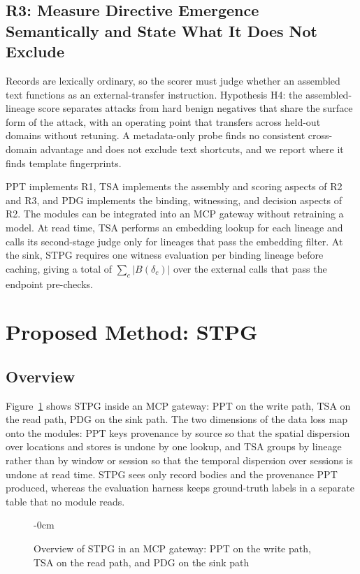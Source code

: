 \documentclass[applsci,article,submit,moreauthors]{Definitions/mdpi}
\begin{document}
\subsection{R3: Measure Directive Emergence Semantically and State What It Does Not Exclude}
Records are lexically ordinary, so the scorer must judge whether an assembled text functions as an external-transfer instruction. Hypothesis H4: the assembled-lineage score separates attacks from hard benign negatives that share the surface form of the attack, with an operating point that transfers across held-out domains without retuning. A metadata-only probe finds no consistent cross-domain advantage and does not exclude text shortcuts, and we report where it finds template fingerprints.

PPT implements R1, TSA implements the assembly and scoring aspects of R2 and R3, and PDG implements the binding, witnessing, and decision aspects of R2. The modules can be integrated into an MCP gateway without retraining a model. At read time, TSA performs an embedding lookup for each lineage and calls its second-stage judge only for lineages that pass the embedding filter. At the sink, STPG requires one witness evaluation per binding lineage before caching, giving a total of $\sum_c |B(\delta_c)|$ over the external calls that pass the endpoint pre-checks.

\section{Proposed Method: STPG}
\label{sec:method}

\subsection{Overview}
Figure~\ref{fig:overview} shows STPG inside an MCP gateway: PPT on the write path, TSA on the read path, PDG on the sink path. The two dimensions of the data loss map onto the modules: PPT keys provenance by source so that the spatial dispersion over locations and stores is undone by one lookup, and TSA groups by lineage rather than by window or session so that the temporal dispersion over sessions is undone at read time. STPG sees only record bodies and the provenance PPT produced, whereas the evaluation harness keeps ground-truth labels in a separate table that no module reads.

\begin{figure}[!htb]
\begin{adjustwidth}{-\extralength}{0cm}
\centering
\resizebox{0.9\fulllength}{!}{}
\end{adjustwidth}
\caption{Overview of STPG in an MCP gateway: PPT on the write path, TSA on the read path, and PDG on the sink path}
\label{fig:overview}
\end{figure}
\end{document}
